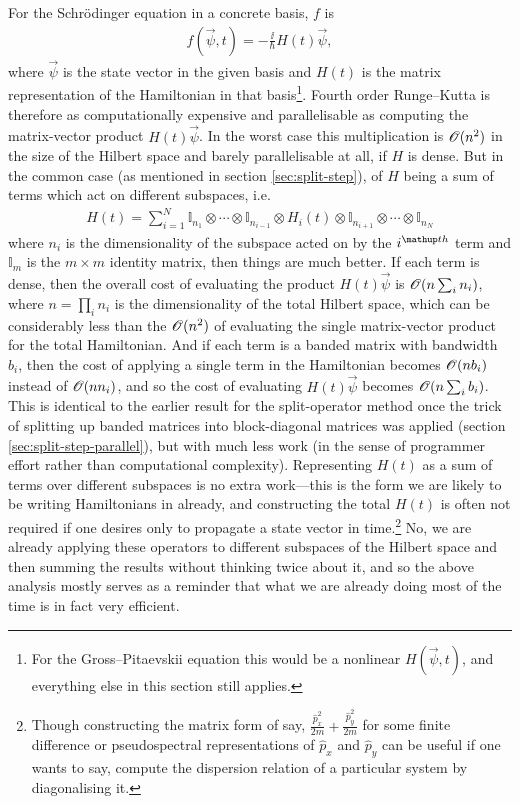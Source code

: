 For the Schr\"odinger equation in a concrete basis, $f$ is
\begin{align}
f(\vec \psi, t) = -\frac\ii\hbar H(t)\vec \psi,
\end{align}
where $\vec \psi$ is the state vector in the given basis and $H(t)$ is the matrix representation of the Hamiltonian in that basis\footnote{For the Gross--Pitaevskii equation this would be a nonlinear $H(\vec \psi, t)$, and everything else in this section still applies.}. Fourth order Runge--Kutta is therefore as computationally expensive and parallelisable as computing the matrix-vector product $H(t)\vec\psi$. In the worst case this multiplication is $\mathscr{O}(n^2)$ in the size of the Hilbert space and barely parallelisable at all, if $H$ is dense. But in the common case (as mentioned in section \ref{sec:split-step}), of $H$ being a sum of terms which act on different subspaces, i.e.
\begin{align}
H(t) = \sum_{i=1}^N \mathbb{I}_{n_1} \otimes \cdots  \otimes \mathbb{I}_{n_{i-1}}
\otimes  H_i(t) \otimes  
 \mathbb{I}_{n_{i+1}} \otimes \cdots \otimes \mathbb{I}_{n_N}
\end{align}
where $n_i$ is the dimensionality of the subspace acted on by the $i^\up{th}$ term and $\mathbb{I}_m$ is the $m\times m$ identity matrix, then things are much better. If each term is dense, then the overall cost of evaluating the product $H(t)\vec\psi$ is $\mathscr{O}(n\sum_i n_i)$, where $n = \prod_i n_i$ is the dimensionality of the total Hilbert space, which can be considerably less than the $\mathscr{O}(n^2)$ of evaluating the single  matrix-vector product for the total Hamiltonian. And if each term is a banded matrix with bandwidth $b_i$, then the cost of applying a single term in the Hamiltonian becomes $\mathscr{O}(n b_i)$ instead of $\mathscr{O}(n n_i)$, and so the cost of evaluating $H(t)\vec\psi$ becomes $\mathscr{O}(n\sum_i b_i)$. This is identical to the earlier result for the split-operator method once the trick of splitting up banded matrices into block-diagonal matrices was applied (section \ref{sec:split-step-parallel}), but with much less work (in the sense of programmer effort rather than computational complexity). Representing $H(t)$ as a sum of terms over different subspaces is no extra work---this is the form we are likely to be writing Hamiltonians in already, and constructing the total $H(t)$ is often not required if one desires only to propagate a state vector in time.\footnote{Though constructing the matrix form of say, $\frac {\hat p_x^2} {2m} + \frac {\hat p_y^2} {2m}$ for some finite difference or pseudospectral representations of $\hat p_x$ and $\hat p_y$ can be useful if one wants to say, compute the dispersion relation of a particular system by diagonalising it.} No, we are already applying these operators to different subspaces of the Hilbert space and then summing the results without thinking twice about it, and so the above analysis mostly serves as a reminder that what we are already doing most of the time is in fact very efficient. 

